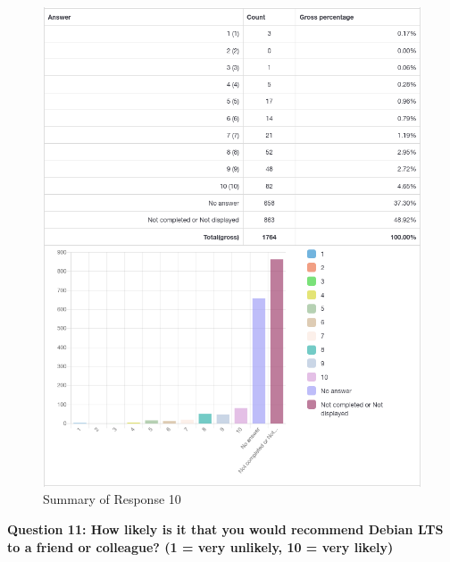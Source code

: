 \documentclass{article}
\begin{document}
\vspace{3mm}
\begin{figure}[h!]
\centering
\includegraphics[width=16.3cm]{assets/10-summary.png}
\caption{Summary of Response 10}
\end{figure}

\newpage

\Large{\textbf{Question 11: How likely is it that you would recommend Debian LTS to a friend or
colleague? (1 = very unlikely, 10 = very likely)}}
\end{document}
